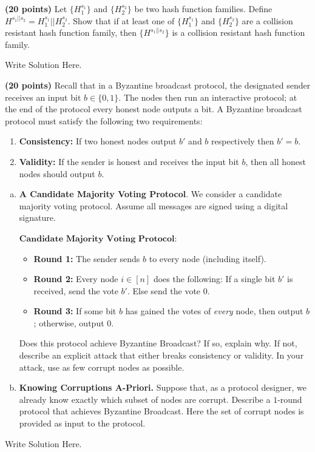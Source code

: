 \documentclass[12pt]{hw}
\begin{document}
\begin{exercise}
\textbf{(20 points)}
    Let $\{H_1^{s_1}\}$ and $\{H_2^{s_2}\}$ be two hash function families. Define $H^{s_1||s_2}= H_1^{s_1} || H_2^{s_2}$. Show that if at least one of $\{H_1^{s_1}\}$ and $\{H_2^{s_2}\}$ are a collision resistant hash function family, then $\{H^{s_1||s_2}\}$ is a collision resistant hash function family.
\end{exercise}
\begin{answer}
Write Solution Here.
\end{answer}

\begin{exercise}
\textbf{(20 points)}
Recall that in a Byzantine broadcast protocol, the designated sender receives an input bit $b \in \{0, 1\}$. The nodes then run an interactive protocol; at the end of the protocol every honest node outputs a bit. A Byzantine broadcast protocol must satisfy the following two requirements:
\begin{enumerate}
    \item \textbf{Consistency: } If two honest nodes output $b'$ and $b$ respectively then $b' = b$. 
    \item \textbf{Validity: } If the sender is honest and receives the input bit $b$, then all honest nodes should output $b$.
\end{enumerate}

\begin{enumerate}[(a)]
    \item \textbf{A Candidate Majority Voting Protocol}.
We consider a candidate majority voting protocol.
Assume all messages are signed using a digital signature.
\begin{mdframed}
    $\textbf{Candidate Majority Voting Protocol}$:
    \begin{itemize}
        \item \textbf{Round 1: } The sender sends $b$ to every node (including itself).
        \item \textbf{Round 2: } Every node $i \in [n]$ does the following: If a single bit $b'$ is received, send the vote $b'$. Else send the vote $0$.
        \item \textbf{Round 3: } If some bit $b$ has gained the votes of \emph{every} node, then output $b$; otherwise, output $0$.
    \end{itemize}
\end{mdframed}

Does this protocol achieve Byzantine Broadcast? If so, explain why. If not, describe an explicit attack that either breaks consistency or validity. In your attack, use as few corrupt nodes as possible.



\item \textbf{Knowing Corruptions A-Priori.}
Suppose that, as a protocol designer, we already know exactly which subset of nodes are corrupt. Describe a $1$-round protocol that achieves Byzantine Broadcast. Here the set of corrupt nodes is provided as input to the protocol.
\end{enumerate}
\end{exercise}
\begin{answer}
Write Solution Here.
\end{answer}
\end{document}
